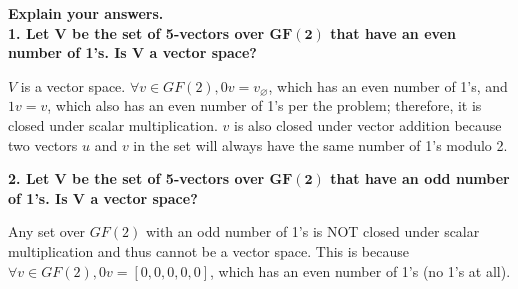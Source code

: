 \documentclass[
  letterpaper,
  DIV=11,
  numbers=noendperiod]{scrartcl}
\begin{document}
\textbf{Explain your answers.}\\
\textbf{1. Let \(\bm{V}\) be the set of 5-vectors over \(\bm{GF(2)}\)
that have an even number of 1's. Is \(\bm{V}\) a vector space?}

\(V\) is a vector space. \(\forall v \in GF(2), 0v = v_\varnothing\),
which has an even number of 1's, and \(1v = v\), which also has an even
number of 1's per the problem; therefore, it is closed under scalar
multiplication. \(v\) is also closed under vector addition because two
vectors \(u\) and \(v\) in the set will always have the same number of
1's modulo 2.

\textbf{2. Let \(\bm{V}\) be the set of 5-vectors over \(\bm{GF(2)}\)
that have an odd number of 1's. Is \(\bm{V}\) a vector space?}

Any set over \(GF(2)\) with an odd number of 1's is NOT closed under
scalar multiplication and thus cannot be a vector space. This is because
\(\forall v \in GF(2), 0v = [0, 0, 0, 0, 0]\), which has an even number
of 1's (no 1's at all).
\end{document}
